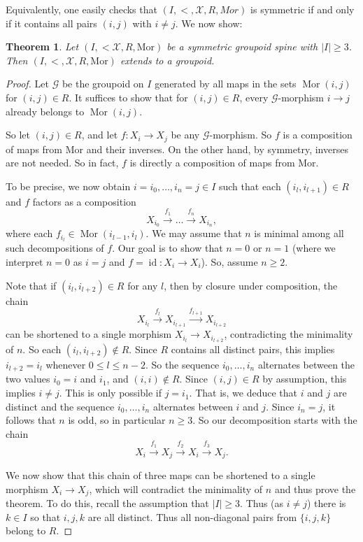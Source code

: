 \documentclass{amsart}
\newtheorem{theorem}{Theorem}[section]
\theoremstyle{definition}
\begin{document}
Equivalently, one easily checks that $(I,<,\mathcal X,R,Mor)$ is symmetric if and only if it contains all pairs $(i,j)$ with $i\neq j$. We now show:

\begin{theorem}\label{T: gp con} Let $(I,<\mathcal X,R,\mathrm{Mor})$ be a symmetric groupoid spine with $|I|\geq 3$.
Then $(I,<,\mathcal X,R,\mathrm{Mor})$ extends to a groupoid.
\end{theorem}
\begin{proof}
    Let $\mathcal G$ be the groupoid on $I$ generated by all maps in the sets $\operatorname{Mor}(i,j)$ for $(i,j)\in R$. It suffices to show that for $(i,j)\in R$, every $\mathcal G$-morphism $i\rightarrow j$ already belongs to $\operatorname{Mor}(i,j)$.

    So let $(i,j)\in R$, and let $f:X_i\rightarrow X_j$ be any $\mathcal G$-morphism. So $f$ is a composition of maps from Mor and their inverses. On the other hand, by symmetry, inverses are not needed. So in fact, $f$ is directly a composition of maps from Mor.
    
    To be precise, we now obtain $i=i_0,\dots,i_n=j\in I$ such that each $(i_l,i_{l+1})\in R$ and $f$ factors as a composition $$X_{i_0}\xrightarrow{f_1}\dots\xrightarrow{f_n}X_{i_n},$$ where each $f_{i_l}\in\operatorname{Mor}(i_{l-1},i_l)$. We may assume that $n$ is minimal among all such decompositions of $f$. Our goal is to show that $n=0$ or $n=1$ (where we interpret $n=0$ as $i=j$ and $f=\operatorname{id}:X_i\rightarrow X_i$). So, assume $n\geq 2$.

    Note that if $(i_l,i_{l+2})\in R$ for any $l$, then by closure under composition, the chain $$X_{i_l}\xrightarrow{f_l}X_{i_{l+1}}\xrightarrow{f_{l+1}}X_{i_{l+2}}$$ can be shortened to a single morphism $X_{i_l}\rightarrow X_{i_{l+2}}$, contradicting the minimality of $n$. So each $(i_l,i_{l+2})\notin R$. Since $R$ contains all distinct pairs, this implies $i_{l+2}=i_l$ whenever $0\leq l\leq n-2$. So the sequence $i_0,\dots,i_n$ alternates between the two values $i_0=i$ and $i_1$, and $(i,i)\notin R$. Since $(i,j)\in R$ by assumption, this implies $i\neq j$. This is only possible if $j=i_1$. That is, we deduce that $i$ and $j$ are distinct and the sequence $i_0,\dots,i_n$ alternates between $i$ and $j$. Since $i_n=j$, it follows that $n$ is odd, so in particular $n\geq 3$. So our decomposition starts with the chain $$X_i\xrightarrow{f_1}X_j\xrightarrow{f_2}X_i\xrightarrow{f_3}X_j.$$

    We now show that this chain of three maps can be shortened to a single morphism $X_i\rightarrow X_j$, which will contradict the minimality of $n$ and thus prove the theorem. To do this, recall the assumption that $|I|\geq 3$. Thus (as $i\neq j$) there is $k\in I$ so that $i,j,k$ are all distinct. Thus all non-diagonal pairs from $\{i,j,k\}$ belong to $R$.


\end{proof}
\end{document}
